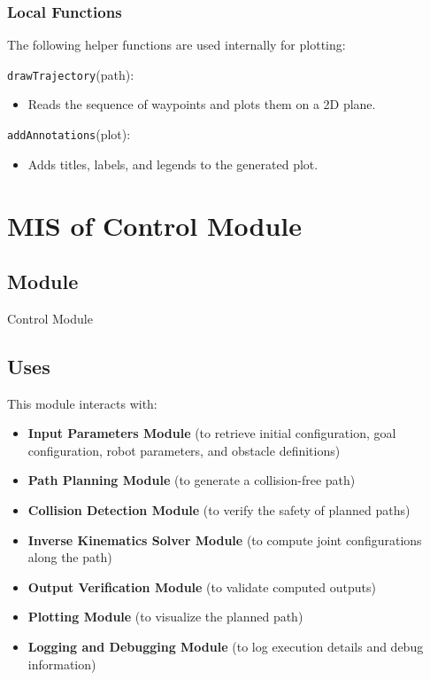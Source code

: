 \documentclass[12pt, titlepage]{article}
\begin{document}
\subsubsection{Local Functions}

The following helper functions are used internally for plotting:

\noindent \texttt{drawTrajectory}(path):
\begin{itemize}
    \item Reads the sequence of waypoints and plots them on a 2D plane.
\end{itemize}

\noindent \texttt{addAnnotations}(plot):
\begin{itemize}
    \item Adds titles, labels, and legends to the generated plot.
\end{itemize}

\newpage



\newpage

\section{MIS of Control Module} \label{Module:Control}

\subsection{Module}

Control Module

\subsection{Uses}

This module interacts with:
\begin{itemize}
    \item \textbf{Input Parameters Module} (to retrieve initial configuration, goal configuration, robot parameters, and obstacle definitions)
    \item \textbf{Path Planning Module} (to generate a collision-free path)
    \item \textbf{Collision Detection Module} (to verify the safety of planned paths)
    \item \textbf{Inverse Kinematics Solver Module} (to compute joint configurations along the path)
    \item \textbf{Output Verification Module} (to validate computed outputs)
    \item \textbf{Plotting Module} (to visualize the planned path)
    \item \textbf{Logging and Debugging Module} (to log execution details and debug information)
\end{itemize}
\end{document}
